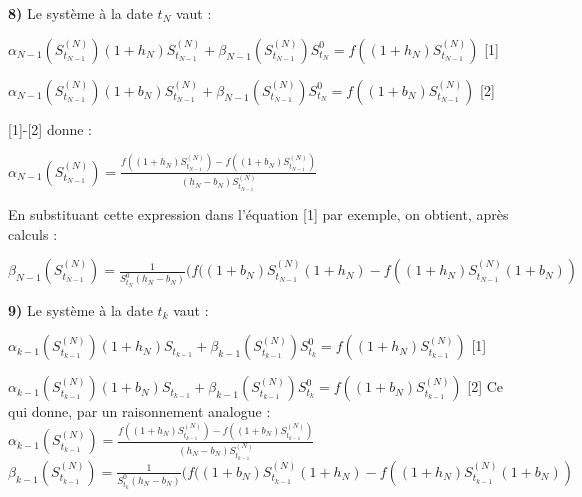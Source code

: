 \documentclass{article}
\begin{document}
\textbf{8)} Le système à la date $t_N$ vaut :


$\alpha_{N-1}(S_{t_{N-1}}^{(N)})(1 + h_N)S_{t_{N-1}}^{(N)} + \beta_{N-1}(S_{t_{N-1}}^{(N)})S_{t_N}^{0} = f((1+h_N)S_{t_{N-1}}^{(N)})$ \hspace{1cm} [1]

$\alpha_{N-1}(S_{t_{N-1}}^{(N)})(1+b_N)S_{t_{N-1}}^{(N)} + \beta_{N-1}(S_{t_{N-1}}^{(N)})S_{t_N}^{0} = f((1+b_N)S_{t_{N-1}}^{(N)})$ \hspace{1cm} [2]


[1]-[2] donne :

$\alpha_{N-1}(S_{t_{N-1}}^{(N)})=\frac{f((1+h_N)S_{t_{N-1}}^{(N)})-f((1+b_N)S_{t_{N-1}}^{(N)})}{(h_N-b_N)S_{t_{N-1}}^{(N)}}$


En substituant cette expression dans l'équation [1] par exemple, on obtient, après calculs :

$\beta_{N-1}(S_{t_{N-1}}^{(N)})=\frac{1}{S_{t_N}^0(h_N-b_N)}(f((1+b_N)S_{t_{N-1}}^{(N)}(1+h_N)-f((1+h_N)S_{t_{N-1}}^{(N)}(1+b_N))$


\textbf{9)} Le système à la date $t_k$ vaut :

$\alpha_{k-1}(S_{t_{k-1}}^{(N)})(1 + h_N)S_{t_{k-1}} + \beta_{k-1}(S_{t_{k-1}}^{(N)})S_{t_k}^{0} = f((1+h_N)S_{t_{k-1}}^{(N)})$ \hspace{1cm} [1]

$\alpha_{k-1}(S_{t_{k-1}}^{(N)})(1+b_N)S_{t_{k-1}} + \beta_{k-1}(S_{t_{k-1}}^{(N)})S_{t_k}^{0} = f((1+b_N)S_{t_{k-1}}^{(N)})$ \hspace{1cm} [2]
\newline
Ce qui donne, par un raisonnement analogue : \newline
$\alpha_{k-1}(S_{t_{k-1}}^{(N)})=\frac{f((1+h_N)S_{t_{k-1}}^{(N)})-f((1+b_N)S_{t_{k-1}}^{(N)})}{(h_N-b_N)S_{t_{k-1}}^{(N)}}$
\newline
$\beta_{k-1}(S_{t_{k-1}}^{(N)})=\frac{1}{S_{t_k}^0(h_N-b_N)}(f((1+b_N)S_{t_{k-1}}^{(N)}(1+h_N)-f((1+h_N)S_{t_{k-1}}^{(N)}(1+b_N))$
\end{document}
